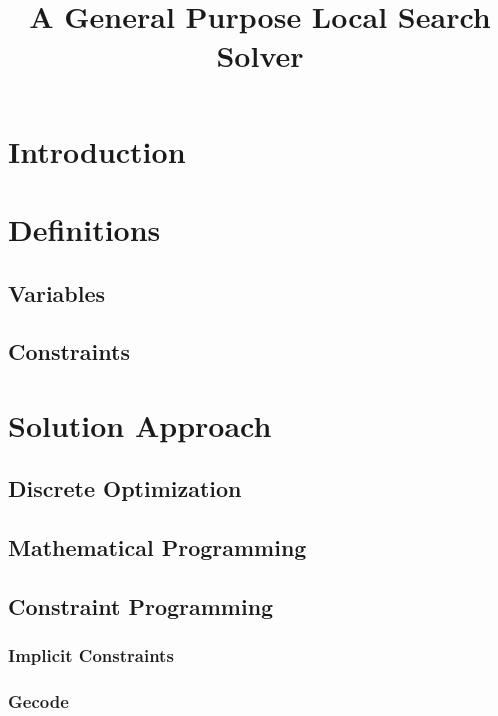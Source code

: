 \documentclass[a4paper,11pt]{article}
\title{A General Purpose Local Search Solver}
\begin{document}
\maketitle

\tableofcontents
\listoffigures
\listoftables
\newpage
\section{Introduction}
 
 
 
\section{Definitions} 
  \subsection{Variables} 
  
  \subsection{Constraints}
  
\section{Solution Approach}  
  \subsection{Discrete Optimization} %
  
  \subsection{Mathematical Programming} %
  
  
  \subsection{Constraint Programming}
    \subsubsection{Implicit Constraints}
    
    \subsubsection{Gecode}
\end{document}
